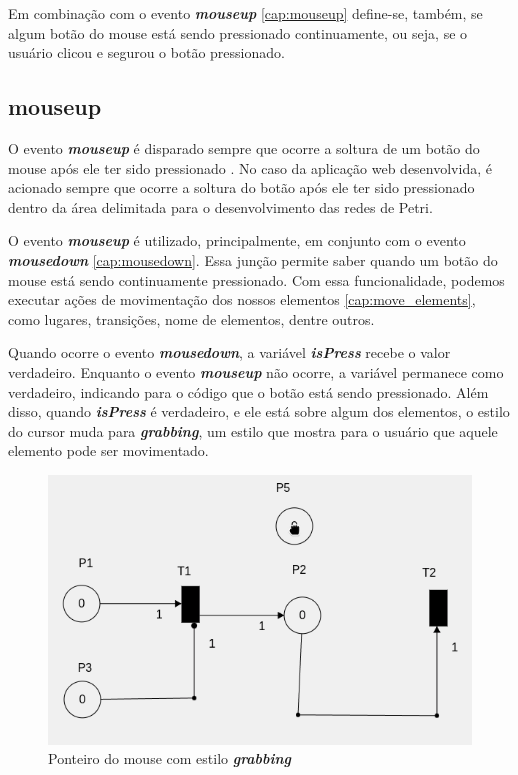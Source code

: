 \documentclass[
	12pt,				%
	openright,			%
	oneside,			%
	a4paper,			%
	english,			%
	brazil				%
	]{abntex2}
\begin{document}
Em combinação com o evento \textbf{\textit{mouseup}} \ref{cap:mouseup} define-se, também, se algum botão do mouse está sendo pressionado continuamente, ou seja, se o usuário clicou e segurou o botão pressionado. 

\subsection*{mouseup}\label{cap:mouseup}

O evento \textbf{\textit{mouseup}} é disparado sempre que ocorre a soltura de um botão do mouse após ele ter sido pressionado \cite{mdn_mouseup_event}. No caso da aplicação web desenvolvida, é acionado sempre que ocorre a soltura do botão após ele ter sido pressionado dentro da área delimitada para o desenvolvimento das redes de Petri.



O evento \textbf{\textit{mouseup}} é utilizado, principalmente, em conjunto com o evento \textbf{\textit{mousedown}} \ref{cap:mousedown}. Essa junção permite saber quando um botão do mouse está sendo continuamente pressionado. Com essa funcionalidade, podemos executar ações de movimentação dos nossos elementos \ref{cap:move_elements}, como lugares, transições, nome de elementos, dentre outros. 



Quando ocorre o evento \textbf{\textit{mousedown}}, a variável \textbf{\textit{isPress}} recebe o valor verdadeiro. Enquanto o evento \textbf{\textit{mouseup}} não ocorre, a variável permanece como verdadeiro, indicando para o código que o botão está sendo pressionado. Além disso, quando \textbf{\textit{isPress}} é verdadeiro, e ele está sobre algum dos elementos, o estilo do cursor muda para \textbf{\textit{grabbing}}, um estilo que mostra para o usuário que aquele elemento pode ser movimentado. 

\begin{figure}[ht] 
	\centering
	\includegraphics[scale=0.4]{figuras/mouse_estilo_grabbing.png}
	\caption[Mouse estilo grabbing]{Ponteiro do mouse com estilo \textbf{\textit{grabbing}}}
	\label{fig:mouse_estilo_grabbing}
\end{figure}
\end{document}
